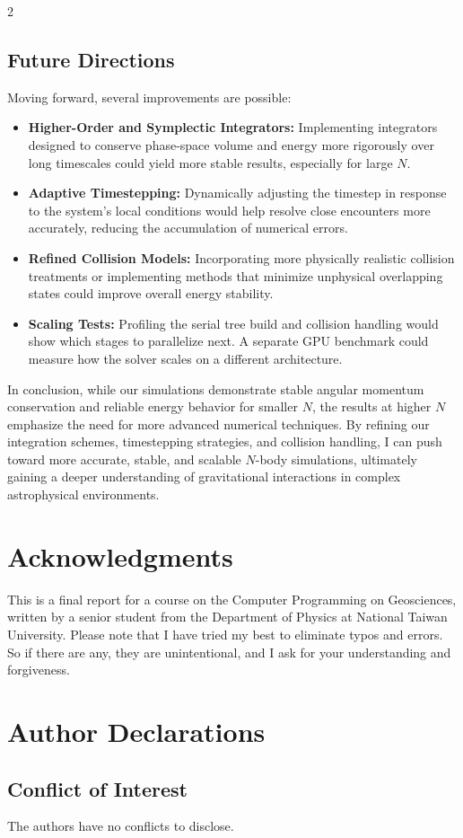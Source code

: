 \documentclass[a4paper, 12pt, oneside, onecolumn]{article}
\begin{document}
\begin{multicols}{2}
\subsection*{Future Directions}

Moving forward, several improvements are possible:

\begin{itemize}
    \item \textbf{Higher-Order and Symplectic Integrators:} Implementing integrators designed to conserve phase-space volume and energy more rigorously over long timescales could yield more stable results, especially for large $N$.
    \item \textbf{Adaptive Timestepping:} Dynamically adjusting the timestep in response to the system’s local conditions would help resolve close encounters more accurately, reducing the accumulation of numerical errors.
    \item \textbf{Refined Collision Models:} Incorporating more physically realistic collision treatments or implementing methods that minimize unphysical overlapping states could improve overall energy stability.
    \item \textbf{Scaling Tests:} Profiling the serial tree build and collision handling would show which stages to parallelize next. A separate GPU benchmark could measure how the solver scales on a different architecture.
\end{itemize}

In conclusion, while our simulations demonstrate stable angular momentum conservation and reliable energy behavior for smaller $N$, the results at higher $N$ emphasize the need for more advanced numerical techniques. By refining our integration schemes, timestepping strategies, and collision handling, I can push toward more accurate, stable, and scalable $N$-body simulations, ultimately gaining a deeper understanding of gravitational interactions in complex astrophysical environments.








\end{multicols}


\section*{Acknowledgments}
This is a final report for a course on the Computer Programming on Geosciences, written by a senior student from the Department of Physics at National Taiwan University. Please note that I have tried my best to eliminate typos and errors. So if there are any, they are unintentional, and I ask for your understanding and forgiveness.
\section*{Author Declarations}
\subsection*{Conflict of Interest}
The authors have no conflicts to disclose.
\newpage
\nocite{*}


\end{document}
